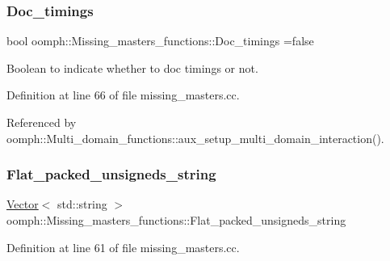 \subsubsection{\texorpdfstring{Doc\+\_\+timings}{Doc\_timings}}
{\footnotesize\ttfamily bool oomph\+::\+Missing\+\_\+masters\+\_\+functions\+::\+Doc\+\_\+timings =false}



Boolean to indicate whether to doc timings or not. 



Definition at line 66 of file missing\+\_\+masters.\+cc.



Referenced by oomph\+::\+Multi\+\_\+domain\+\_\+functions\+::aux\+\_\+setup\+\_\+multi\+\_\+domain\+\_\+interaction().

\mbox{\label{namespaceoomph_1_1Missing__masters__functions_af558db56295524af220b5b4c981d5aa0}} 
\subsubsection{\texorpdfstring{Flat\+\_\+packed\+\_\+unsigneds\+\_\+string}{Flat\_packed\_unsigneds\_string}}
{\footnotesize\ttfamily \hyperlink{classoomph_1_1Vector}{Vector}$<$ std\+::string $>$ oomph\+::\+Missing\+\_\+masters\+\_\+functions\+::\+Flat\+\_\+packed\+\_\+unsigneds\+\_\+string}



Definition at line 61 of file missing\+\_\+masters.\+cc.



